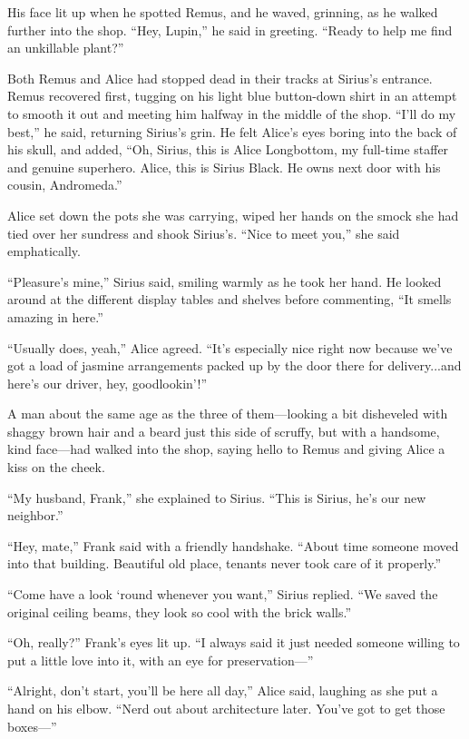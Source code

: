 His face lit up when he spotted Remus, and he waved, grinning, as he walked further into the shop. “Hey, Lupin,” he said in greeting. “Ready to help me find an unkillable plant?”

Both Remus and Alice had stopped dead in their tracks at Sirius’s entrance. Remus recovered first, tugging on his light blue button-down shirt in an attempt to smooth it out and meeting him halfway in the middle of the shop. “I’ll do my best,” he said, returning Sirius’s grin. He felt Alice’s eyes boring into the back of his skull, and added, “Oh, Sirius, this is Alice Longbottom, my full-time staffer and genuine superhero. Alice, this is Sirius Black. He owns next door with his cousin, Andromeda.”

Alice set down the pots she was carrying, wiped her hands on the smock she had tied over her sundress and shook Sirius’s. “Nice to meet you,” she said emphatically.

“Pleasure’s mine,” Sirius said, smiling warmly as he took her hand. He looked around at the different display tables and shelves before commenting, “It smells amazing in here.”

“Usually does, yeah,” Alice agreed. “It’s especially nice right now because we’ve got a load of jasmine arrangements packed up by the door there for delivery...and here’s our driver, hey, goodlookin’!”

A man about the same age as the three of them—looking a bit disheveled with shaggy brown hair and a beard just this side of scruffy, but with a handsome, kind face—had walked into the shop, saying hello to Remus and giving Alice a kiss on the cheek.

“My husband, Frank,” she explained to Sirius. “This is Sirius, he’s our new neighbor.”

“Hey, mate,” Frank said with a friendly handshake. “About time someone moved into that building. Beautiful old place, tenants never took care of it properly.”

“Come have a look ‘round whenever you want,” Sirius replied. “We saved the original ceiling beams, they look so cool with the brick walls.”

“Oh, really?” Frank’s eyes lit up. “I always said it just needed someone willing to put a little love into it, with an eye for preservation—”

“Alright, don’t start, you’ll be here all day,” Alice said, laughing as she put a hand on his elbow. “Nerd out about architecture later. You’ve got to get those boxes—”

